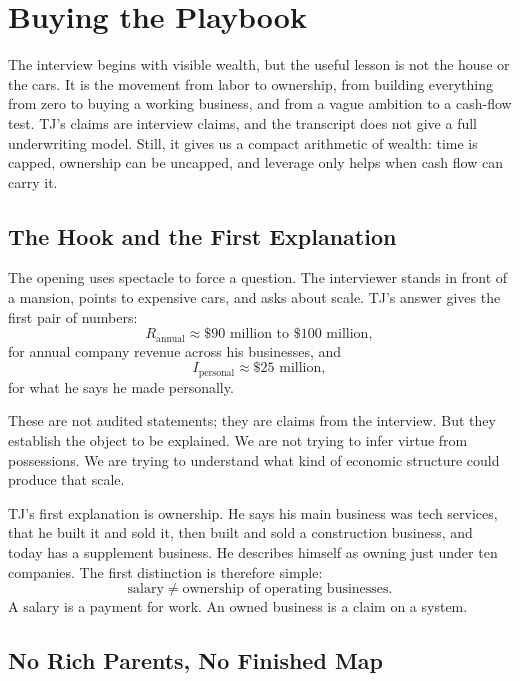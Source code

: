\chapter{Buying the Playbook}

The interview begins with visible wealth, but the useful lesson is not the house or the cars. It is the movement from labor to ownership, from building everything from zero to buying a working business, and from a vague ambition to a cash-flow test. TJ's claims are interview claims, and the transcript does not give a full underwriting model. Still, it gives us a compact arithmetic of wealth: time is capped, ownership can be uncapped, and leverage only helps when cash flow can carry it.

\section{The Hook and the First Explanation}

The opening uses spectacle to force a question. The interviewer stands in front of a mansion, points to expensive cars, and asks about scale. TJ's answer gives the first pair of numbers:
\begin{equation}
R_{\mathrm{annual}} \approx \$90\text{ million to }\$100\text{ million},
\end{equation}
for annual company revenue across his businesses, and
\begin{equation}
I_{\mathrm{personal}} \approx \$25\text{ million},
\end{equation}
for what he says he made personally.

These are not audited statements; they are claims from the interview. But they establish the object to be explained. We are not trying to infer virtue from possessions. We are trying to understand what kind of economic structure could produce that scale.

TJ's first explanation is ownership. He says his main business was tech services, that he built it and sold it, then built and sold a construction business, and today has a supplement business. He describes himself as owning just under ten companies. The first distinction is therefore simple:
\begin{equation}
\text{salary} \neq \text{ownership of operating businesses}.
\end{equation}
A salary is a payment for work. An owned business is a claim on a system.

\section{No Rich Parents, No Finished Map}

